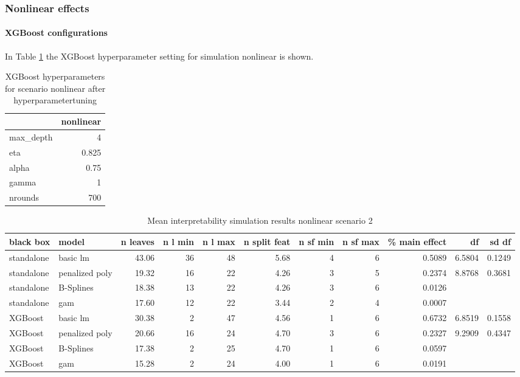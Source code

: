 \subsubsection{Nonlinear effects}

\paragraph{XGBoost configurations}
In Table \ref{tab:app_xgboost_config_nonlinear} the XGBoost hyperparameter setting for simulation nonlinear is shown.
\begin{table}[!htb]
    \centering
    \begin{tabular}{l|r}
    \hline
    & nonlinear  \\
    \hline
    max\_depth & 4 \\
    eta & 0.825 \\
    alpha & 0.75 \\
    gamma & 1 \\
    nrounds & 700 \\
    \hline
    \end{tabular}
    \caption{XGBoost hyperparameters for scenario nonlinear after hyperparametertuning}
    \label{tab:app_xgboost_config_nonlinear}
\end{table}


\begin{table}[!htb]

\centering \tiny
\begin{tabular}[t]{l|l|r|r|r|r|r|r|r|r|r}
\hline
black box & model & n leaves & n l min & n l max & n split feat & n sf min & n sf max & \% main effect & df & sd df\\
\hline
standalone & basic lm & 43.06 & 36 & 48 & 5.68 & 4 & 6 & 0.5089 & 6.5804 & 0.1249\\
standalone & penalized poly & 19.32 & 16 & 22 & 4.26 & 3 & 5 & 0.2374 & 8.8768 & 0.3681\\
standalone & B-Splines & 18.38 & 13 & 22 & 4.26 & 3 & 6 & 0.0126 & & \\
standalone & gam & 17.60 & 12 & 22 & 3.44 & 2 & 4 & 0.0007 & & \\
\hline
XGBoost & basic lm & 30.38 & 2 & 47 & 4.56 & 1 & 6 & 0.6732 & 6.8519 & 0.1558\\
XGBoost & penalized poly & 20.66 & 16 & 24 & 4.70 & 3 & 6 & 0.2327 & 9.2909 & 0.4347\\
XGBoost & B-Splines & 17.38 & 2 & 25 & 4.70 & 1 & 6 & 0.0597 & &\\
XGBoost & gam & 15.28 & 2 & 24 & 4.00 & 1 & 6 & 0.0191 & &\\
\hline
\end{tabular}
\caption{Mean interpretability simulation results nonlinear scenario 2}
\label{tab:app_nonlinear_interpretability}

\end{table}


